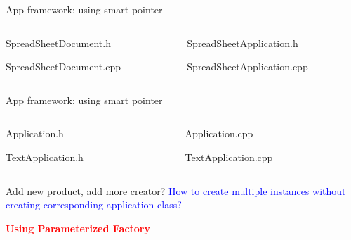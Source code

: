 \documentclass[13pt]{beamer}
\begin{document}
\begin{frame}{App framework: using smart pointer}
\begin{columns}[T]
\begin{column}{.45\textwidth}
\lstset{basicstyle=\tiny,style=myCustomCppStyle}
SpreadSheetDocument.h

SpreadSheetDocument.cpp

\end{column}

\begin{column}{.45\textwidth}
\lstset{basicstyle=\tiny,style=myCustomCppStyle}
SpreadSheetApplication.h

SpreadSheetApplication.cpp

\end{column}
\end{columns}
\end{frame}

\begin{frame}{App framework: using smart pointer}
\begin{columns}[T]
\begin{column}{.45\textwidth}
\lstset{basicstyle=\tiny,style=myCustomCppStyle}
Application.h

TextApplication.h

\end{column}

\begin{column}{.45\textwidth}
\lstset{basicstyle=\tiny,style=myCustomCppStyle}
Application.cpp

TextApplication.cpp

\end{column}
\end{columns}
\end{frame}

\begin{frame}{Add new product, add more creator?}
	\textcolor{blue}{How to create multiple instances without creating corresponding application class?}	
	\begin{center}
	\textcolor{red}{\textbf{Using Parameterized Factory}}
	\end{center}
\end{frame}
\end{document}
